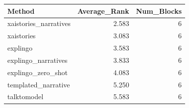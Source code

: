 \begin{tabular}{lrr}
\toprule
Method & Average_Rank & Num_Blocks \\
\midrule
xaistories_narratives & 2.583 & 6 \\
xaistories & 3.083 & 6 \\
explingo & 3.583 & 6 \\
explingo_narratives & 3.833 & 6 \\
explingo_zero_shot & 4.083 & 6 \\
templated_narrative & 5.250 & 6 \\
talktomodel & 5.583 & 6 \\
\bottomrule
\end{tabular}
